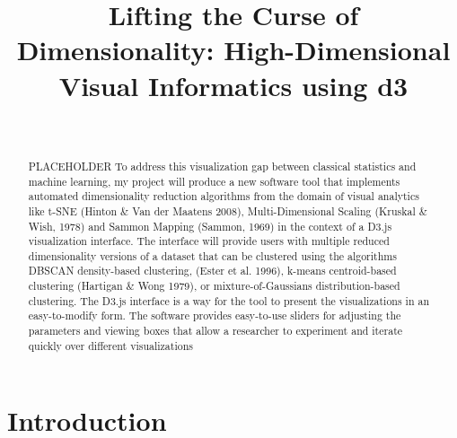 \documentclass{sigchi}
\def\plaintitle{Lifting the Curse of Dimensionality: High-Dimensional Visual Informatics using d3}
\begin{document}
\title{\plaintitle}

\author{%
  \\
}

\maketitle%

\begin{abstract}
PLACEHOLDER To address this visualization gap between classical statistics and machine learning, my project will produce a new software tool that implements automated dimensionality reduction algorithms from the domain of visual analytics like t-SNE (Hinton \& Van der Maatens 2008), Multi-Dimensional Scaling (Kruskal \& Wish, 1978) and Sammon Mapping (Sammon, 1969) in the context of a D3.js visualization interface. The interface will provide users with multiple reduced dimensionality versions of a dataset that can be clustered using the algorithms DBSCAN density-based clustering, (Ester et al. 1996), k-means centroid-based clustering (Hartigan \& Wong 1979), or mixture-of-Gaussians distribution-based clustering. The D3.js interface is a way for the tool to present the visualizations in an easy-to-modify form. The software provides easy-to-use sliders for adjusting the parameters and viewing boxes that allow a researcher to experiment and iterate quickly over different visualizations 
\end{abstract}

\section{Introduction}
\end{document}

